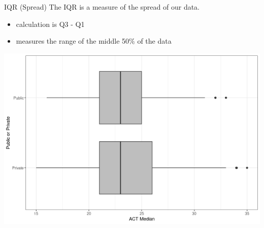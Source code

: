 \documentclass{beamer}
\begin{document}
\begin{frame}{IQR (Spread)}
The IQR is a measure of the spread of our data.
\begin{itemize}
    \item calculation is Q3 - Q1
    \item measures the range of the middle 50$\%$ of the data
\end{itemize}
\begin{center}
\includegraphics[scale=.35]{img/box_private.png}
\end{center}
\end{frame}
\end{document}
